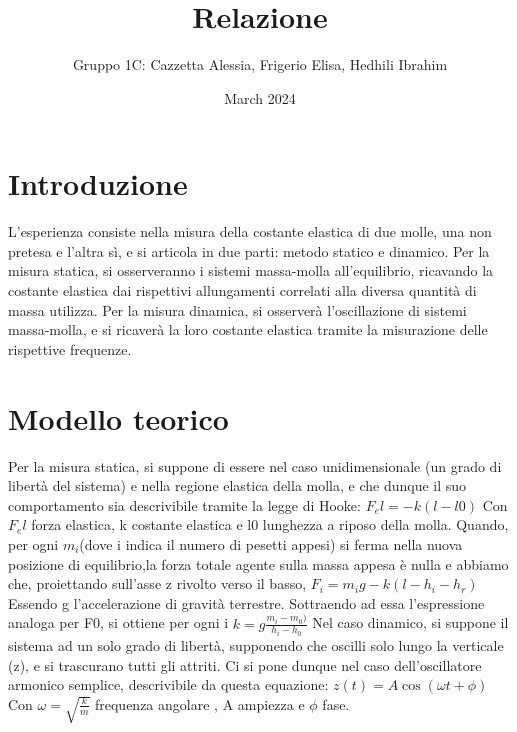 \documentclass{article}
\title{Relazione}
\author{Gruppo 1C: Cazzetta Alessia, Frigerio Elisa, Hedhili Ibrahim }
\date{March 2024}
\begin{document}
\maketitle

\section{Introduzione}


L'esperienza consiste nella misura della costante elastica di due molle, una non pretesa e l'altra sì,  e si articola in due parti: metodo statico e dinamico. 
Per la misura statica, si osserveranno i sistemi massa-molla all'equilibrio, ricavando la costante elastica dai rispettivi allungamenti correlati alla diversa quantità di massa utilizza.
Per la misura dinamica, si osserverà l'oscillazione di sistemi massa-molla, e si ricaverà la loro costante elastica tramite la misurazione delle rispettive frequenze. 

\section{Modello teorico }
Per la misura statica, si suppone di essere nel caso unidimensionale (un grado di libertà del sistema) e  nella regione elastica della molla, e che dunque il suo comportamento  sia descrivibile tramite la legge di Hooke: $F_el= - k (l-l0)$
Con $F_el$ forza elastica, k costante elastica e l0 lunghezza a riposo della molla. 
Quando, per ogni $m_i $(dove i indica il numero di pesetti appesi) si ferma nella nuova posizione di equilibrio,la forza totale agente sulla massa appesa è nulla e abbiamo che, proiettando sull'asse z rivolto verso il basso, 
$F_i= m_i g -k(l-h_i-h_r)$
Essendo g l’accelerazione di gravità terrestre. Sottraendo ad essa l'espressione analoga per F0, si ottiene per ogni i
$k=g \frac{m_i-m_0)}{h_i-h_0}$
Nel caso dinamico, si suppone il sistema ad un solo grado di libertà, supponendo che oscilli solo lungo la verticale (z),  e si trascurano tutti gli attriti. Ci si pone dunque nel caso dell'oscillatore armonico semplice, descrivibile da questa equazione:  
$z(t)= A \cos(\omega t+ \phi) $
Con $\omega=\sqrt{\frac{k}{m}}$ frequenza angolare , A ampiezza e $\phi$ fase. 
\end{document}
